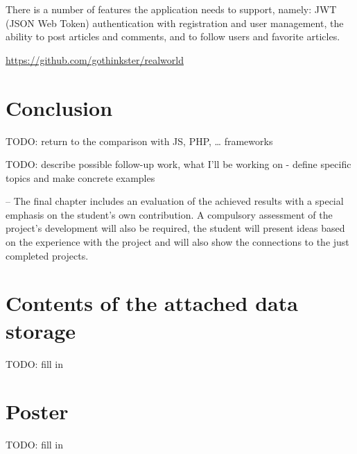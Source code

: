 \documentclass[english,odsaz]{fitthesis}
\begin{document}
There is a number of features the application needs to support, namely: JWT
(JSON Web Token) authentication with registration and user management, the
ability to post articles and comments, and to follow users and favorite articles.

\url{https://github.com/gothinkster/realworld}

\chapter{Conclusion}
\label{sec:org9729db8}
TODO: return to the comparison with JS, PHP, \ldots{} frameworks

TODO: describe possible follow-up work, what I'll be working on - define
  specific topics and make concrete examples

-- The final chapter includes an evaluation of the achieved results with a special
emphasis on the student's own contribution. A compulsory assessment of the
project's development will also be required, the student will present ideas
based on the experience with the project and will also show the connections to
the just completed projects. \cite{Pravidla}

\makeatletter
\def\@openbib@code{\addcontentsline{toc}{chapter}{Bibliography}}
\makeatother


\begin{flushleft}

\end{flushleft}
\iftwoside\cleardoublepage\fi

\appendix
\appendixpage
\iftwoside\cleardoublepage\fi

\startcontents[chapters]
\iftwoside\cleardoublepage\fi

\chapter{Contents of the attached data storage}
\label{sec:orga724515}
TODO: fill in

\chapter{Poster}
\label{sec:orgc5f7b5f}
TODO: fill in
\end{document}
